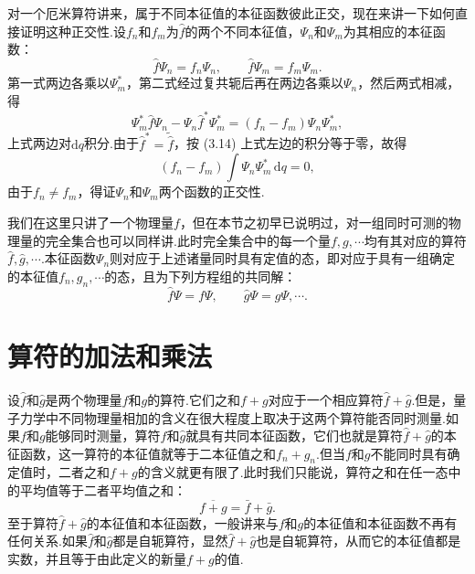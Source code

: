 对一个厄米算符讲来，属于不同本征值的本征函数彼此正交，现在来讲一下如何直接证明这种正交性.设$f_n$和$f_m$为$\hat{f}$的两个不同本征值，$\varPsi_n$和$\varPsi_m$为其相应的本征函数：
\begin{equation*}
  \hat{f}\varPsi_n=f_n\varPsi_n,\qquad\hat{f}\varPsi_m=f_m\varPsi_m.
\end{equation*}
第一式两边各乘以$\varPsi_m^{*}$，第二式经过复共轭后再在两边各乘以$\varPsi_n$，然后两式相减，得
\begin{equation*}
  \varPsi_m^{*}\hat{f}\varPsi_n-\varPsi_n\hat{f}^{*}\varPsi_m^{*}
  =(f_n-f_m)\varPsi_n\varPsi_m^{*},
\end{equation*}
上式两边对$\mathrm{d}q$积分.由于$\hat{f}^{*}=\tilde{\hat{f}}$，按 (3.14) 上式左边的积分等于零，故得
\begin{equation*}
  (f_n-f_m)\int\varPsi_n\varPsi_m^{*}\,\mathrm{d}q=0,
\end{equation*}
由于$f_n\neq f_m$，得证$\varPsi_n$和$\varPsi_m$两个函数的正交性.

我们在这里只讲了一个物理量$f$，但在本节之初早已说明过，对一组同时可测的物理量的完全集合也可以同样讲.此时完全集合中的每一个量$f,g,\cdots$均有其对应的算符$\hat{f},\hat{g},\cdots$.本征函数$\varPsi_n$则对应于上述诸量同时具有定值的态，即对应于具有一组确定的本征值$f_n,g_n,\cdots$的态，且为下列方程组的共同解：
\begin{equation*}
  \hat{f}\varPsi=f\varPsi,\qquad\hat{g}\varPsi=g\varPsi,\cdots.
\end{equation*}

\section{算符的加法和乘法}

设$\hat{f}$和$\hat{g}$是两个物理量$f$和$g$的算符.它们之和$f+g$对应于一个相应算符$\hat{f}+\hat{g}$.但是，量子力学中不同物理量相加的含义在很大程度上取决于这两个算符能否同时测量.如果$f$和$g$能够同时测量，算符$\hat{f}$和$\hat{g}$就具有共同本征函数，它们也就是算符$\hat{f}+\hat{g}$的本征函数，这一算符的本征值就等于二本征值之和$f_n+g_n$.但当$f$和$g$不能同时具有确定值时，二者之和$f+g$的含义就更有限了.此时我们只能说，算符之和在任一态中的平均值等于二者平均值之和：
\begin{equation}
  \overline{f+g}=\bar{f}+\bar{g}.
\end{equation}
至于算符$\hat{f}+\hat{g}$的本征值和本征函数，一般讲来与$f$和$g$的本征值和本征函数不再有任何关系.如果$\hat{f}$和$\hat{g}$都是自轭算符，显然$\hat{f}+\hat{g}$也是自轭算符，从而它的本征值都是实数，并且等于由此定义的新量$f+g$的值.

